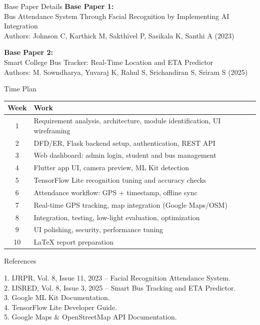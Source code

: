 \documentclass{beamer}
\begin{document}
\begin{frame}{Base Paper Details}
    \textbf{Base Paper 1:}\\
    Bus Attendance System Through Facial Recognition by Implementing AI Integration\\
    Authors: Johnson C, Karthick M, Sakthivel P, Sasikala K, Santhi A (2023)

    \vspace{8pt}
    \textbf{Base Paper 2:}\\
    Smart College Bus Tracker: Real-Time Location and ETA Predictor\\
    Authors: M. Sowndharya, Yuvaraj K, Rahul S, Srichandiran S, Sriram S (2025)
\end{frame}

\begin{frame}{Time Plan}
\begin{tabular}{|c|p{9cm}|}
\hline
\textbf{Week} & \textbf{Work} \\
\hline
1 & Requirement analysis, architecture, module identification, UI wireframing \\\hline
2 & DFD/ER, Flask backend setup, authentication, REST API \\\hline
3 & Web dashboard: admin login, student and bus management \\\hline
4 & Flutter app UI, camera preview, ML Kit detection \\\hline
5 & TensorFlow Lite recognition tuning and accuracy checks \\\hline
6 & Attendance workflow: GPS + timestamp, offline sync \\\hline
7 & Real-time GPS tracking, map integration (Google Maps/OSM) \\\hline
8 & Integration, testing, low-light evaluation, optimization \\\hline
9 & UI polishing, security, performance tuning \\\hline
10 & LaTeX report preparation \\
\hline
\end{tabular}
\end{frame}

\begin{frame}{References}
    \begin{enumerate}
1. IJRPR, Vol. 8, Issue 11, 2023 – Facial Recognition Attendance System.\\
2. IJSRED, Vol. 8, Issue 3, 2025 – Smart Bus Tracking and ETA Predictor.\\
3. Google ML Kit Documentation.\\
4. TensorFlow Lite Developer Guide.\\
5. Google Maps & OpenStreetMap API Documentation.
    \end{enumerate}
\end{frame}
\end{document}
